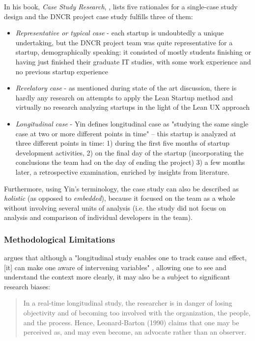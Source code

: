\documentclass{article}
\begin{document}
In his book, \textit{Case Study Research}, \cite{yin2013case}, lists five rationales for a single-case study design and the DNCR project case study fulfills three of them:
\begin{itemize}
\item \textit{Representative or typical case} - each startup is undoubtedly a unique undertaking, but the DNCR project team was quite representative for a startup, demographically speaking: it consisted of mostly students finishing or having just finished their graduate IT studies, with some work experience and no previous startup experience
\item \textit{Revelatory case} - as mentioned during state of the art discussion, there is hardly any research on attempts to apply the Lean Startup method and virtually no research analyzing startups in the light of the Lean UX approach
\item \textit{Longitudinal case} - Yin defines longitudinal case as "studying the same single case at two or more different points in time" \citep[49]{yin2013case} – this startup is analyzed at three different points in time: 1) during the first five months of startup development activities, 2) on the final day of the startup (incorporating the conclusions the team had on the day of ending the project) 3) a few months later, a retrospective examination, enriched by insights from literature.
\end{itemize}

Furthermore, using Yin's terminology, the case study can also be described as \textit{holistic} (as opposed to \textit{embedded}), because it focused on the team as a whole without involving several units of analysis (i.e. the study did not focus on analysis and comparison of individual developers in the team).

\subsubsection{Methodological Limitations}
\citeauthor{meyer2001case} argues that although a "longitudinal study enables one to track cause and effect, [it] can make one aware of intervening variables" \cite[347]{meyer2001case}, allowing one to see and understand the context more clearly, it may also be a subject to significant research biases:
\begin{quote}
In a real-time longitudinal study, the researcher is in danger of losing objectivity and of becoming too involved with the organization, the people, and the process. Hence, Leonard-Barton (1990) claims that one may be perceived as, and may even become, an advocate rather than an observer. \citep[344]{meyer2001case}
\end{quote}
\end{document}
